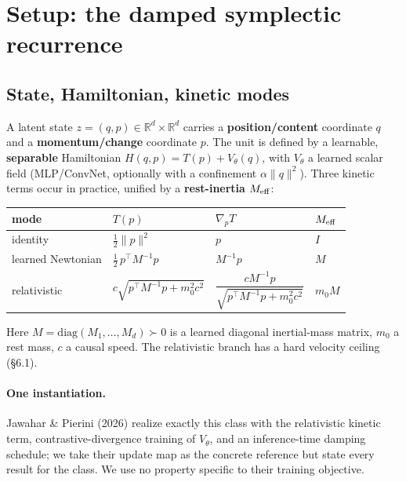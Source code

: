 \documentclass[11pt]{article}
\theoremstyle{plain}
\theoremstyle{definition}
\newcommand{\half}{\tfrac12}
\begin{document}
\section{Setup: the damped symplectic recurrence}

\subsection{State, Hamiltonian, kinetic modes}
A latent state $z=(q,p)\in\mathbb R^d\times\mathbb R^d$ carries a \textbf{position/content} coordinate $q$ and a \textbf{momentum/change} coordinate $p$. The unit is defined by a learnable, \textbf{separable} Hamiltonian $H(q,p)=T(p)+V_\theta(q)$, with $V_\theta$ a learned scalar field (MLP/ConvNet, optionally with a confinement $\alpha\lVert q\rVert^2$). Three kinetic terms occur in practice, unified by a \textbf{rest-inertia} $M_{\rm eff}$:

\begin{center}\small
\begin{tabular}{llll}
\toprule
mode & $T(p)$ & $\nabla_pT$ & $M_{\rm eff}$ \\
\midrule
identity & $\half\lVert p\rVert^2$ & $p$ & $I$ \\
learned Newtonian & $\half\,p^\top M^{-1}p$ & $M^{-1}p$ & $M$ \\
relativistic & $c\sqrt{p^\top M^{-1}p+m_0^2c^2}$ & $\dfrac{cM^{-1}p}{\sqrt{p^\top M^{-1}p+m_0^2c^2}}$ & $m_0M$ \\
\bottomrule
\end{tabular}
\end{center}

Here $M=\mathrm{diag}(M_1,\dots,M_d)\succ0$ is a learned diagonal inertial-mass matrix, $m_0$ a rest mass, $c$ a causal speed. The relativistic branch has a hard velocity ceiling (\S6.1).

\paragraph{One instantiation.} Jawahar \& Pierini (2026) realize exactly this class with the relativistic kinetic term, contrastive-divergence training of $V_\theta$, and an inference-time damping schedule; we take their update map as the concrete reference but state every result for the class. We use no property specific to their training objective.
\end{document}
